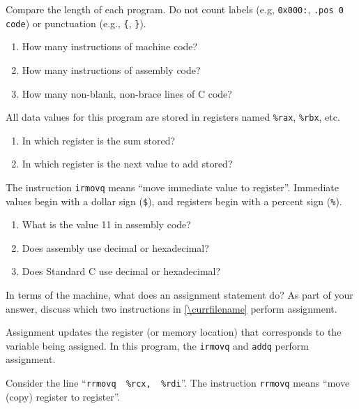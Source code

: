 

\Q Compare the length of each program. Do not count labels (e.g, \verb|0x000:|, \verb|.pos 0 code|) or punctuation (e.g., \verb|{|, \verb|}|).

\begin{enumerate}
\item How many instructions of machine code?  
\item How many instructions of assembly code?  
\item How many non-blank, non-brace lines of C code?  
\end{enumerate}


\Q All data values for this program are stored in registers named \verb|%rax|, \verb|%rbx|, etc.

\begin{enumerate}
\item In which register is the sum stored?  
\item In which register is the next value to add stored?  
\end{enumerate}


\Q The instruction \verb|irmovq| means ``move immediate value to register''. Immediate values begin with a dollar sign (\verb|$|), and registers begin with a percent sign (\verb|%|).

\begin{enumerate}
\item What is the value 11 in assembly code?  
\item Does assembly use decimal or hexadecimal?  
\item Does Standard C use decimal or hexadecimal?  
\end{enumerate}


\Q In terms of the machine, what does an assignment statement do?
As part of your answer, discuss which two instructions in \ref{\currfilename} perform assignment.

\begin{answer}
Assignment updates the register (or memory location) that corresponds to the variable being assigned.
In this program, the \verb|irmovq| and \verb|addq| perform assignment.
\end{answer}


\Q Consider the line ``\verb|rrmovq  %rcx,  %rdi|''.
The instruction \verb|rrmovq| means ``move (copy) register to register''.

